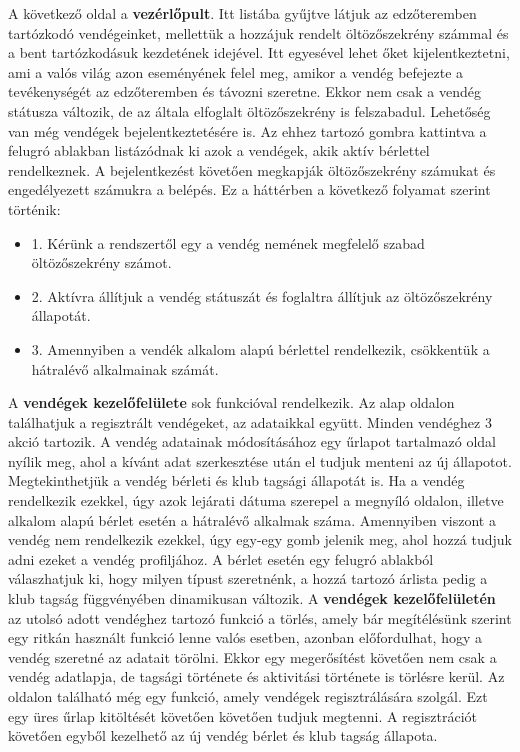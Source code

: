 \documentclass[12pt]{article}
\begin{document}
A következő oldal a \textbf{vezérlőpult}. Itt listába gyűjtve látjuk az edzőteremben tartózkodó vendégeinket, mellettük a hozzájuk rendelt öltözőszekrény számmal és a bent tartózkodásuk kezdetének idejével. Itt egyesével lehet őket kijelentkeztetni, ami a valós világ azon eseményének felel meg, amikor a vendég befejezte a tevékenységét az edzőteremben és távozni szeretne. Ekkor nem csak a vendég státusza változik, de az általa elfoglalt öltözőszekrény is felszabadul. Lehetőség van még vendégek bejelentkeztetésére is. Az ehhez tartozó gombra kattintva a felugró ablakban listázódnak ki azok a vendégek, akik aktív bérlettel rendelkeznek. A bejelentkezést követően megkapják öltözőszekrény számukat és engedélyezett számukra a belépés. Ez a háttérben a következő folyamat szerint történik:
\begin{itemize}
\item 1. Kérünk a rendszertől egy a vendég nemének megfelelő szabad öltözőszekrény számot.
\item 2. Aktívra állítjuk a vendég státuszát és foglaltra állítjuk az öltözőszekrény állapotát.
\item 3. Amennyiben a vendék alkalom alapú bérlettel rendelkezik, csökkentük a hátralévő alkalmainak számát.
\end{itemize}

A \textbf{vendégek kezelőfelülete} sok funkcióval rendelkezik. Az alap oldalon találhatjuk a regisztrált vendégeket, az adataikkal együtt. Minden vendéghez 3 akció tartozik. A vendég adatainak módosításához egy űrlapot tartalmazó oldal nyílik meg, ahol a kívánt adat szerkesztése után el tudjuk menteni az új állapotot. Megtekinthetjük a vendég bérleti és klub tagsági állapotát is. Ha a vendég rendelkezik ezekkel, úgy azok lejárati dátuma szerepel a megnyíló oldalon, illetve alkalom alapú bérlet esetén a hátralévő alkalmak száma. Amennyiben viszont a vendég nem rendelkezik ezekkel, úgy egy-egy gomb jelenik meg, ahol hozzá tudjuk adni ezeket a vendég profiljához. A bérlet esetén egy felugró ablakból válaszhatjuk ki, hogy milyen típust szeretnénk, a hozzá tartozó árlista pedig a klub tagság függvényében dinamikusan változik. A  \textbf{vendégek kezelőfelületén} az utolsó adott vendéghez tartozó funkció a törlés, amely bár megítélésünk szerint egy ritkán használt funkció lenne valós esetben, azonban előfordulhat, hogy a vendég szeretné az adatait törölni. Ekkor egy megerősítést követően nem csak a vendég adatlapja, de tagsági története és aktivitási története is törlésre kerül. Az oldalon található még egy funkció, amely vendégek regisztrálására szolgál. Ezt egy üres űrlap kitöltését követően követően tudjuk megtenni. A regisztrációt követően egyből kezelhető az új vendég bérlet és klub tagság állapota.
\end{document}
